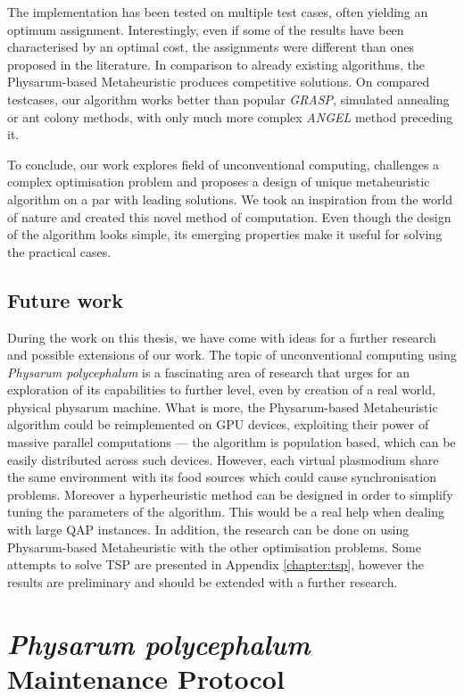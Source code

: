 \documentclass[english,a4paper,twoside]{ppfcmthesis}
\begin{document}
The implementation has been tested on multiple test cases, often yielding an optimum assignment. Interestingly, even if some of the results have been characterised by an optimal cost, the assignments were different than ones proposed in the literature. In comparison to already existing algorithms, the Physarum-based Metaheuristic produces competitive solutions. On compared testcases, our algorithm works better than popular \textit{GRASP}, simulated annealing or ant colony methods, with only much more complex \textit{ANGEL} method preceding it.

To conclude, our work explores field of unconventional computing, challenges a complex optimisation problem and proposes a design of unique metaheuristic algorithm on a par with leading solutions. We took an inspiration from the world of nature and created this novel method of computation. Even though the design of the algorithm looks simple, its emerging properties make it useful for solving the practical cases. 


\section*{Future work}

During the work on this thesis, we have come with ideas for a further research and possible extensions of our work. The topic of unconventional computing using \textit{Physarum polycephalum} is a fascinating area of research that urges for an exploration of its capabilities to further level, even by creation of a real world, physical physarum machine. What is more, the Physarum-based Metaheuristic algorithm could be reimplemented on GPU devices, exploiting their power of massive parallel computations --- the algorithm is population based, which can be easily distributed across such devices. However, each virtual plasmodium share the same environment with its food sources which could cause synchronisation problems. Moreover a hyperheuristic method can be designed in order to simplify tuning the parameters of the algorithm. This would be a real help when dealing with large QAP instances. In addition, the research can be done on using Physarum-based Metaheuristic with the other optimisation problems. Some attempts to solve TSP are presented in Appendix \ref{chapter:tsp}, however the results are preliminary and should be extended with a further research.

\cleardoublepage\appendix

\chapter{\textit{Physarum polycephalum} Maintenance Protocol}
\label{chapter:protocol}
\end{document}

